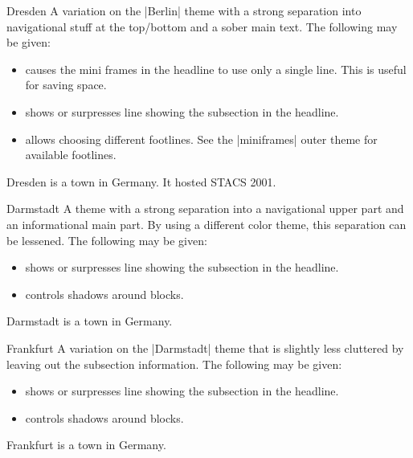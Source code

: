 \begin{themeexample}{Dresden}
  A variation on the |Berlin| theme with a strong separation into navigational stuff at the top/bottom and a sober main text. The following  may be given:
  \begin{itemize}
  \item {} causes the mini frames in the headline to use only a single line. This is useful for saving space.
  \item {} shows or surpresses line showing the subsection in the headline.
  \item {} allows choosing different footlines. See the |miniframes| outer theme for available footlines.
  \end{itemize}

  Dresden is a town in Germany. It hosted STACS 2001.
\end{themeexample}


\begin{themeexample}{Darmstadt}
  A theme with a strong separation into a navigational upper part and an informational main part. By using a different color theme, this separation can be lessened. The following  may be given:
  \begin{itemize}
  \item {} shows or surpresses line showing the subsection in the headline.
  \item {} controls shadows around blocks.
  \end{itemize}

  Darmstadt is a town in Germany.
\end{themeexample}

\begin{themeexample}{Frankfurt}
  A variation on the |Darmstadt| theme that is slightly less cluttered by leaving out the subsection information. The following  may be given:
  \begin{itemize}
  \item {} shows or surpresses line showing the subsection in the headline.
  \item {} controls shadows around blocks.
  \end{itemize}

  Frankfurt is a town in Germany.
\end{themeexample}

